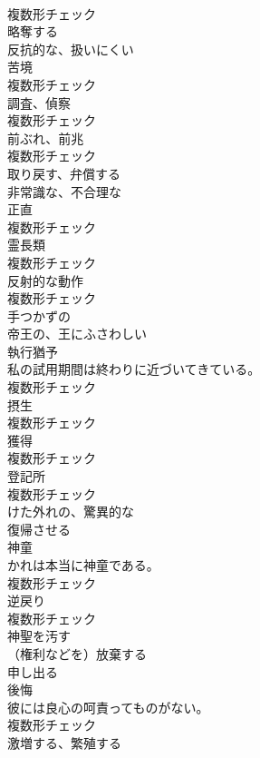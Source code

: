 \documentclass[8pt]{extreport}
\begin{document}
\begin{CJK}{UTF8}{min}
\\	複数形チェック
\\	[形容詞]	略奪する	
\\	[形容詞]	反抗的な、扱いにくい	
\\	[名詞]	苦境	
\\	複数形チェック
\\	[名詞]	調査、偵察	
\\	複数形チェック
\\	[名詞]	前ぶれ、前兆	
\\	複数形チェック
\\	[動詞]	取り戻す、弁償する	
\\	[形容詞]	非常識な、不合理な	
\\	[名詞]	正直	
\\	複数形チェック
\\	[名詞]	霊⻑類	
\\	複数形チェック
\\	[名詞]	反射的な動作	
\\	複数形チェック
\\	[形容詞]	手つかずの	
\\	[形容詞]	帝王の、王にふさわしい	
\\	[名詞]	執行猶予	
\\	私の試用期間は終わりに近づいてきている。	
\\	複数形チェック
\\	[名詞]	摂生	
\\	複数形チェック
\\	[名詞]	獲得	
\\	複数形チェック
\\	[名詞]	登記所	
\\	複数形チェック
\\	[形容詞]	けた外れの、驚異的な	
\\	[動詞]	復帰させる	
\\	[名詞]	神童	
\\	かれは本当に神童である。	
\\	複数形チェック
\\	[名詞]	逆戻り	
\\	複数形チェック
\\	[動詞]	神聖を汚す	
\\	[動詞]	（権利などを）放棄する	
\\	[動詞]	申し出る	
\\	[名詞]	後悔	
\\	彼には良心の呵責ってものがない。	
\\	複数形チェック
\\	[動詞]	激増する、繁殖する	

\end{CJK}
\end{document}

